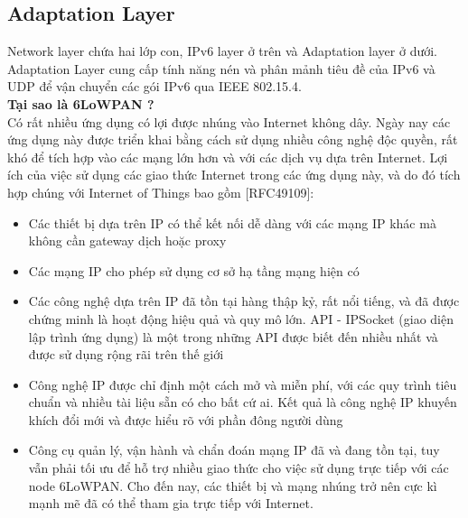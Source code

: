 \documentclass{report}
\begin{document}
\subsection{Adaptation Layer}
Network layer chứa hai lớp con, IPv6 layer ở trên và Adaptation layer ở dưới. Adaptation Layer cung cấp tính năng nén và phân mảnh tiêu đề của IPv6 và UDP để vận chuyển các gói IPv6 qua IEEE 802.15.4. \\

\textbf{Tại sao là 6LoWPAN ?} \\

Có rất nhiều ứng dụng có lợi được nhúng vào Internet không dây. Ngày nay các ứng dụng
này được triển khai bằng cách sử dụng nhiều công nghệ độc quyền, rất khó để tích hợp vào
các mạng lớn hơn và với các dịch vụ dựa trên Internet. Lợi ích của việc sử dụng các giao thức
Internet trong các ứng dụng này, và do đó tích hợp chúng với Internet of Things bao gồm
[RFC49109]:
\begin{itemize}
	\item Các thiết bị dựa trên IP có thể kết nối dễ dàng với các mạng IP khác mà không cần gateway
	dịch hoặc proxy
	\item Các mạng IP cho phép sử dụng cơ sở hạ tầng mạng hiện có
	\item Các công nghệ dựa trên IP đã tồn tại hàng thập kỷ, rất nổi tiếng, và đã được chứng minh là
	hoạt động hiệu quả và quy mô lớn. API - IPSocket (giao diện lập trình ứng dụng) là một trong
	những API được biết đến nhiều nhất và được sử dụng rộng rãi trên thế giới
	\item Công nghệ IP được chỉ định một cách mở và miễn phí, với các quy trình tiêu chuẩn và nhiều
	tài liệu sẵn có cho bất cứ ai. Kết quả là công nghệ IP khuyến khích đổi mới và được hiểu rõ
	với phần đông người dùng
	\item Công cụ quản lý, vận hành và chẩn đoán mạng IP đã và đang tồn tại, tuy vẫn phải tối ưu
	để hỗ trợ nhiều giao thức cho việc sử dụng trực tiếp với các node 6LoWPAN. Cho đến nay,
	các thiết bị và mạng nhúng trở nên cực kì mạnh mẽ đã có thể tham gia trực tiếp với Internet.
\end{itemize}
\end{document}
